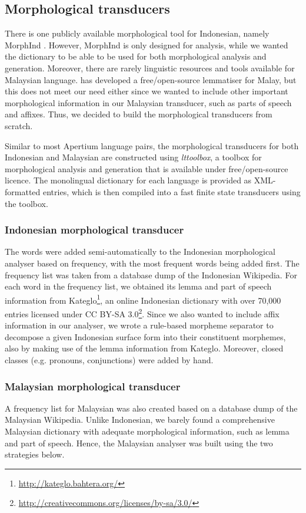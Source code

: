 \documentclass[10pt,a5paper,twoside]{article}
\begin{document}
\subsection{Morphological transducers}
There is one publicly available morphological tool for Indonesian, namely MorphInd \citep{larasati2011indonesian}. However, MorphInd is only designed for analysis, while we wanted the dictionary to be able to be used for both morphological analysis and generation. Moreover, there are rarely linguistic resources and tools available for Malaysian language. \citet{Baldwin06opensource} has developed a free/open-source lemmatiser for Malay, but this does not meet our need either since we wanted to include other important morphological information in our Malaysian transducer, such as parts of speech and affixes. Thus, we decided to build the morphological transducers from scratch.

Similar to most Apertium language pairs, the morphological transducers for both Indonesian and Malaysian are constructed using \emph{lttoolbox}, a toolbox for morphological analysis and generation that is available under free/open-source licence. The monolingual dictionary for each language is provided as XML-formatted entries, which is then compiled into a fast finite state transducers using the toolbox.

\subsubsection{Indonesian morphological transducer}
The words were added semi-automatically to the Indonesian morphological analyser based on frequency, with the most frequent words being added first. The frequency list was taken from a database dump of the Indonesian Wikipedia. For each word in the frequency list, we obtained its lemma and part of speech information from Kateglo\footnote{\url{http://kateglo.bahtera.org/}}, an online Indonesian dictionary with over 70,000 entries licensed under CC BY-SA 3.0\footnote{\url{http://creativecommons.org/licenses/by-sa/3.0/}}. Since we also wanted to include affix information in our analyser, we wrote a rule-based morpheme separator to decompose a given Indonesian surface form into their constituent morphemes, also by making use of the lemma information from Kateglo. Moreover, closed classes (e.g. pronouns, conjunctions) were added by hand.

\subsubsection{Malaysian morphological transducer}
A frequency list for Malaysian was also created based on a database dump of the Malaysian Wikipedia. Unlike Indonesian, we barely found a comprehensive Malaysian dictionary with adequate morphological information, such as lemma and part of speech. Hence, the Malaysian analyser was built using the two strategies below.
\end{document}
